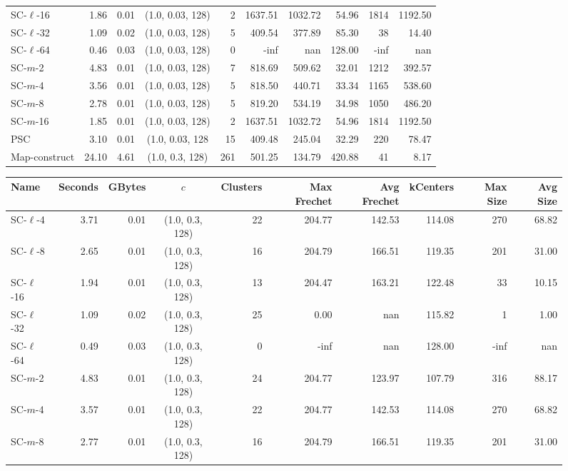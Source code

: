 \documentclass[11pt]{article}
\begin{document}
\begin{figure}[h]
\begin{center}
\begin{minipage}{\textwidth}
{\begin{tabular}{@{}lrrcrrrrrr@{}}
        SC-$\ell$-16 & 1.86 & 0.01 & (1.0, 0.03, 128) & 2 & 1637.51 & 1032.72 & 54.96 & 1814 & 1192.50\\
        SC-$\ell$-32 & 1.09 & 0.02 & (1.0, 0.03, 128) & 5 & 409.54 & 377.89 & 85.30 & 38 & 14.40\\
        SC-$\ell$-64 & 0.46 & 0.03 & (1.0, 0.03, 128) & 0 & -inf & nan & 128.00 & -inf & nan\\
        SC-$m$-2 & 4.83 & 0.01 & (1.0, 0.03, 128) & 7 & 818.69 & 509.62 & 32.01 & 1212 & 392.57\\
        SC-$m$-4 & 3.56 & 0.01 & (1.0, 0.03, 128) & 5 & 818.50 & 440.71 & 33.34 & 1165 & 538.60\\
        SC-$m$-8 & 2.78 & 0.01 & (1.0, 0.03, 128) & 5 & 819.20 & 534.19 & 34.98 & 1050 & 486.20\\
        SC-$m$-16 & 1.85 & 0.01 & (1.0, 0.03, 128) & 2 & 1637.51 & 1032.72 & 54.96 & 1814 & 1192.50\\
        PSC & 3.10 & 0.01 & (1.0, 0.03, 128 & 15 & 409.48 & 245.04 & 32.29 & 220 & 78.47\\
        Map-construct & 24.10 & 4.61 & (1.0, 0.3, 128) & 261 & 501.25 & 134.79 & 420.88 & 41 & 8.17\\
        \bottomrule
    \end{tabular}}
%
    {
    \begin{tabular}{@{}lrrcrrrrrr@{}}
        \toprule
        Name & Seconds & GBytes & $c$ & Clusters & Max Frechet & Avg Frechet & kCenters & Max Size & Avg Size\\
        \midrule
        SC-$\ell$-4 & 3.71 & 0.01 & (1.0, 0.3, 128) & 22 & 204.77 & 142.53 & 114.08 & 270 & 68.82\\
        SC-$\ell$-8 & 2.65 & 0.01 & (1.0, 0.3, 128) & 16 & 204.79 & 166.51 & 119.35 & 201 & 31.00\\
        SC-$\ell$-16 & 1.94 & 0.01 & (1.0, 0.3, 128) & 13 & 204.47 & 163.21 & 122.48 & 33 & 10.15\\
        SC-$\ell$-32 & 1.09 & 0.02 & (1.0, 0.3, 128) & 25 & 0.00 & nan & 115.82 & 1 & 1.00\\
        SC-$\ell$-64 & 0.49 & 0.03 & (1.0, 0.3, 128) & 0 & -inf & nan & 128.00 & -inf & nan\\
        SC-$m$-2 & 4.83 & 0.01 & (1.0, 0.3, 128) & 24 & 204.77 & 123.97 & 107.79 & 316 & 88.17\\
        SC-$m$-4 & 3.57 & 0.01 & (1.0, 0.3, 128) & 22 & 204.77 & 142.53 & 114.08 & 270 & 68.82\\
        SC-$m$-8 & 2.77 & 0.01 & (1.0, 0.3, 128) & 16 & 204.79 & 166.51 & 119.35 & 201 & 31.00\\

\end{tabular}}
\end{minipage}
\end{center}
\end{figure}
\end{document}
